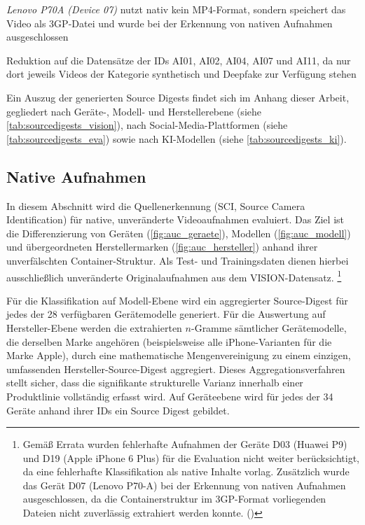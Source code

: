 \begin{table}[H]
\begin{threeparttable}
        \begin{tablenotes}\scriptsize
            \item[a] \textit{Lenovo P70A (Device 07)} nutzt nativ kein MP4-Format, sondern speichert das Video als 3GP-Datei und wurde bei der Erkennung von nativen Aufnahmen ausgeschlossen
            \item[b] Reduktion auf die Datensätze der IDs AI01, AI02, AI04, AI07 und AI11, da nur dort jeweils Videos der Kategorie synthetisch und Deepfake zur Verfügung stehen
        \end{tablenotes}

        \caption{Evaluationsszenarien samt Eingrenzung der Trainings- und Testdaten (eigene Darstellung)}
        \label{tab:szenarien}
        
    \end{threeparttable}
\end{table}

Ein Auszug der generierten Source Digests findet sich im Anhang dieser Arbeit, gegliedert nach Geräte-, Modell- und Herstellerebene (siehe \cref{tab:sourcedigests_vision}), nach Social-Media-Plattformen (siehe \cref{tab:sourcedigests_eva}) sowie nach KI-Modellen (siehe \cref{tab:sourcedigests_ki}).


\subsection{Native Aufnahmen}

In diesem Abschnitt wird die Quellenerkennung (SCI, Source Camera Identification) für native, unveränderte Videoaufnahmen evaluiert. Das Ziel ist die Differenzierung von Geräten (\cref{fig:auc_geraete}), Modellen (\cref{fig:auc_modell}) und übergeordneten Herstellermarken (\cref{fig:auc_hersteller}) anhand ihrer unverfälschten Container-Struktur. Als Test- und Trainingsdaten dienen hierbei ausschließlich unveränderte Originalaufnahmen aus dem VISION-Datensatz\cite{shullani_vision_2017}. \footnote{Gemäß Errata wurden fehlerhafte Aufnahmen der Geräte D03 (Huawei P9) und D19 (Apple iPhone 6 Plus) für die Evaluation nicht weiter berücksichtigt, da eine fehlerhafte Klassifikation als native Inhalte vorlag. Zusätzlich wurde das Gerät D07 (Lenovo P70-A) bei der Erkennung von nativen Aufnahmen ausgeschlossen, da die Containerstruktur im 3GP-Format vorliegenden Dateien nicht zuverlässig extrahiert werden konnte. ()}

Für die Klassifikation auf Modell-Ebene wird ein aggregierter Source-Digest für jedes der 28 verfügbaren Gerätemodelle generiert. Für die Auswertung auf Hersteller-Ebene werden die extrahierten \(n\)-Gramme sämtlicher Gerätemodelle, die derselben Marke angehören (beispielsweise alle iPhone-Varianten für die Marke Apple), durch eine mathematische Mengenvereinigung zu einem einzigen, umfassenden Hersteller-Source-Digest aggregiert. Dieses Aggregationsverfahren stellt sicher, dass die signifikante strukturelle Varianz innerhalb einer Produktlinie vollständig erfasst wird. Auf Geräteebene wird für jedes der 34 Geräte anhand ihrer IDs ein Source Digest gebildet.

